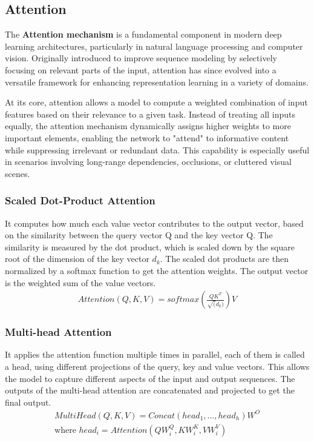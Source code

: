 \subsection{Attention}

The \textbf{Attention mechanism} is a fundamental component in modern deep learning architectures, particularly in natural language processing and computer vision. Originally introduced to improve sequence modeling by selectively focusing on relevant parts of the input, attention has since evolved into a versatile framework for enhancing representation learning in a variety of domains.

At its core, attention allows a model to compute a weighted combination of input features based on their relevance to a given task. Instead of treating all inputs equally, the attention mechanism dynamically assigns higher weights to more important elements, enabling the network to "attend" to informative content while suppressing irrelevant or redundant data. This capability is especially useful in scenarios involving long-range dependencies, occlusions, or cluttered visual scenes.

\subsubsection{Scaled Dot-Product Attention}It computes how much each value vector contributes to the output vector, based on the similarity between the query vector Q and the key vector Q. The similarity is measured by the dot product, which is scaled down by the square root of the dimension of the key vector $d_k$. The scaled dot products are then normalized by a softmax function to get the attention weights. The output vector is the weighted sum of the value vectors.
\begin{align}
    Attention (Q,K,V)=softmax(\frac{QK^T}{\sqrt(d_k)})V
\end{align}

\subsubsection{Multi-head Attention}It applies the attention function multiple times in parallel, each of them is called a head, using different projections of the query, key and value vectors. This allows the model to capture different aspects of the input and output sequences. The outputs of the multi-head attention are concatenated and projected to get the final output.
\begin{align}
    MultiHead(Q,K,V)= Concat(head_1,...,head_h)W^O\\
    \text{where } head_i=Attention(QW_{i}^Q, KW_{i}^K, VW_{i}^V)
\end{align}

